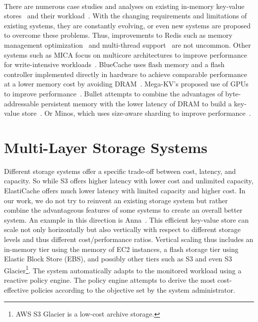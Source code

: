 ~\\
There are numerous case studies and analyses on existing in-memory key-value stores~\cite{kaur_-memory_2018, chen_towards_2016, lubis_multi-thread_2015} and their workload~\cite{atikoglu_workload_2012}. With the changing requirements and limitations of existing systems, they are constantly evolving, or even new systems are proposed to overcome these problems. Thus, improvements to Redis such as memory management optimization~\cite{zhang_redis_2018} and multi-thread support~\cite{lubis_multi-thread_2015} are not uncommon. Other systems such as MICA focus on multicore architectures to improve performance for write-intensive workloads~\cite{lim_mica_2014}. BlueCache uses flash memory and a flash controller implemented directly in hardware to achieve comparable performance at a lower memory cost by avoiding DRAM~\cite{xu_bluecache_2016}. Mega-KV's proposed use of GPUs to improve performance~\cite{zhang_mega-kv_2015}. Bullet attempts to combine the advantages of byte-addressable persistent memory with the lower latency of DRAM to build a key-value store~\cite{huang_closing_2018}. Or Minos, which uses size-aware sharding to improve performance~\cite{didona_size-aware_2018}.

\section{Multi-Layer Storage Systems}
\label{subsec:multi_layer_storage_system}
Different storage systems offer a specific trade-off between cost, latency, and capacity. So while S3 offers higher latency with lower cost and unlimited capacity, ElastiCache offers much lower latency with limited capacity and higher cost. In our work, we do not try to reinvent an existing storage system but rather combine the advantageous features of some systems to create an overall better system. An example in this direction is Anna~\cite{wu_autoscaling_2019}. This efficient key-value store can scale not only horizontally but also vertically with respect to different storage levels and thus different cost/performance ratios. Vertical scaling thus includes an in-memory tier using the memory of EC2 instances, a flash storage tier using Elastic Block Store (EBS), and possibly other tiers such as S3 and even S3 Glacier\footnote{AWS S3 Glacier is a low-cost archive storage.}. The system automatically adapts to the monitored workload using a reactive policy engine. The policy engine attempts to derive the most cost-effective policies according to the objective set by the system administrator.

